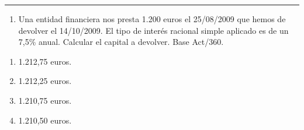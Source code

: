 \documentclass[
  letterpaper,
  DIV=11,
  numbers=noendperiod]{scrreprt}
\providecommand{\tightlist}{%
  \setlength{\itemsep}{0pt}\setlength{\parskip}{0pt}}\usepackage{longtable,booktabs,array}
\begin{document}
\begin{center}\rule{0.5\linewidth}{0.5pt}\end{center}

\begin{enumerate}
\def\labelenumi{\arabic{enumi}.}
\setcounter{enumi}{4}
\tightlist
\item
  Una entidad financiera nos presta 1.200 euros el 25/08/2009 que hemos
  de devolver el 14/10/2009. El tipo de interés racional simple aplicado
  es de un 7,5\% anual. Calcular el capital a devolver. Base Act/360.
\end{enumerate}

\begin{enumerate}
\def\labelenumi{\alph{enumi})}
\item
  1.212,75 euros.
\item
  1.212,25 euros.
\item
  1.210,75 euros.
\item
  1.210,50 euros.
\end{enumerate}
\end{document}
